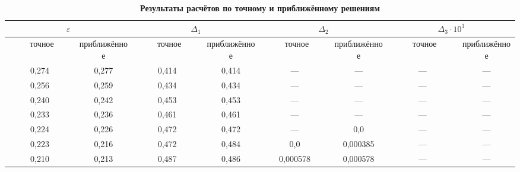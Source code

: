 \begin{table}\centering \small

\caption*{\bf Результаты расчётов по точному и приближённому решениям} \vspace{-3mm}

\begin{tabular}{c|c|c|c|c|c|c|c}

\hline

\multicolumn{2}{c|}{\footnotesize $\varepsilon$} & 

\multicolumn{2}{c|}{\footnotesize $\Delta_1$} & 

\multicolumn{2}{c|}{\footnotesize $\Delta_2$} & 

\multicolumn{2}{c}{\footnotesize $\Delta_3 \cdot 10^3$}  \\ \hline

\footnotesize ~~~~~точное~~~~~ & 

\footnotesize приближённое & 

\footnotesize ~~~~~точное~~~~~ & 

\footnotesize приближённое & 

\footnotesize ~~~~~точное~~~~~ & 

\footnotesize приближённое & 

\footnotesize ~~~~~точное~~~~~ & 

\footnotesize приближённое \\ \hline

\rule{0mm}{12pt}%

0,274\phantom{00}& 0,277\phantom{00}&0,414&0,414&---&---&---&--- \\ 

0,256\phantom{00}&0,259\phantom{00}&0,434&0,434&---&---&---&--- \\ 

0,240\phantom{00}&0,242\phantom{00}&0,453&0,453&---&---&---&--- \\ 

0,233\phantom{00}&0,236\phantom{00}&0,461&0,461&---&---&---&--- \\ 

0,224\phantom{00}&0,226\phantom{00}&0,472&0,472&---&0,0\phantom{00000}&---&--- \\ 

0,223\phantom{00}& 0,216\phantom{00}&0,472&0,484&0,0\phantom{00000} &0,000385&---&--- \\ 

0,210\phantom{00}& 0,213\phantom{00}&0,487&0,486&0,000578&0,000578&---&--- \\


\end{tabular}
\end{table}
